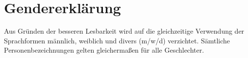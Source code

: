 \section*{Gendererklärung}
Aus Gründen der besseren Lesbarkeit wird auf die gleichzeitige Verwendung der Sprachformen männlich, weiblich und divers (m/w/d) verzichtet. Sämtliche Personenbezeichnungen gelten gleichermaßen für alle Geschlechter. 

\newpage
\fancyhead[L]{\slshape\nouppercase\leftmark}
